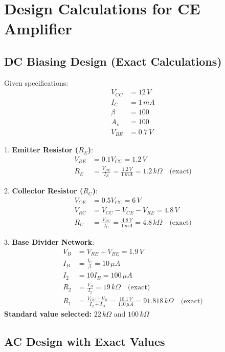 \documentclass[conference]{IEEEtran}
\begin{document}
\section{Design Calculations for CE Amplifier}

\subsection{DC Biasing Design (Exact Calculations)}
Given specifications:
\begin{align*}
    V_{CC} &= 12\,V \\
    I_C &= 1\,mA \\
    \beta &= 100 \\
    A_v &= 100 \\
    V_{BE} &= 0.7\,V
\end{align*}

1. \textbf{Emitter Resistor ($R_E$)}:
\begin{align*}
    V_{RE} &= 0.1V_{CC} = 1.2\,V \\
    R_E &= \frac{V_{RE}}{I_E} = \frac{1.2\,V}{1\,mA} = 1.2\,k\Omega \quad \text{(exact)}
\end{align*}

2. \textbf{Collector Resistor ($R_C$)}:
\begin{align*}
    V_{CE} &= 0.5V_{CC} = 6\,V \\
    V_{RC} &= V_{CC} - V_{CE} - V_{RE} = 4.8\,V \\
    R_C &= \frac{V_{RC}}{I_C} = \frac{4.8\,V}{1\,mA} = 4.8\,k\Omega \quad \text{(exact)}
\end{align*}

3. \textbf{Base Divider Network}:
\begin{align*}
    V_B &= V_{RE} + V_{BE} = 1.9\,V \\
    I_B &= \frac{I_C}{\beta} = 10\,\mu A \\
    I_2 &= 10I_B = 100\,\mu A \\
    R_2 &= \frac{V_B}{I_2} = 19\,k\Omega \quad \text{(exact)} \\
    R_1 &= \frac{V_{CC}-V_B}{I_2+I_B} = \frac{10.1\,V}{110\,\mu A} = 91.818\,k\Omega \quad \text{(exact)}
\end{align*}
\textbf{Standard value selected:} $22\,k\Omega$ and $100\,k\Omega$

\subsection{AC Design with Exact Values}
\end{document}
